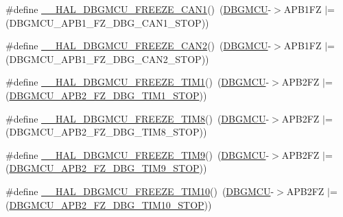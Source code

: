\begin{DoxyCompactItemize}
\item 
\#define \hyperlink{group___h_a_l___exported___macros_ga1d225003f36f6a22ffea1a41a4a78cec}{\+\_\+\+\_\+\+H\+A\+L\+\_\+\+D\+B\+G\+M\+C\+U\+\_\+\+F\+R\+E\+E\+Z\+E\+\_\+\+C\+A\+N1}()~(\hyperlink{group___peripheral__declaration_ga92ec6d9ec2251fda7d4ce09748cd74b4}{D\+B\+G\+M\+CU}-\/$>$A\+P\+B1\+FZ $\vert$= (D\+B\+G\+M\+C\+U\+\_\+\+A\+P\+B1\+\_\+\+F\+Z\+\_\+\+D\+B\+G\+\_\+\+C\+A\+N1\+\_\+\+S\+T\+OP))
\item 
\#define \hyperlink{group___h_a_l___exported___macros_gadb4f2b03a03936de95c1a9f939d452c0}{\+\_\+\+\_\+\+H\+A\+L\+\_\+\+D\+B\+G\+M\+C\+U\+\_\+\+F\+R\+E\+E\+Z\+E\+\_\+\+C\+A\+N2}()~(\hyperlink{group___peripheral__declaration_ga92ec6d9ec2251fda7d4ce09748cd74b4}{D\+B\+G\+M\+CU}-\/$>$A\+P\+B1\+FZ $\vert$= (D\+B\+G\+M\+C\+U\+\_\+\+A\+P\+B1\+\_\+\+F\+Z\+\_\+\+D\+B\+G\+\_\+\+C\+A\+N2\+\_\+\+S\+T\+OP))
\item 
\#define \hyperlink{group___h_a_l___exported___macros_ga93d7e54d78e5dea068f5f6a94d5f94c7}{\+\_\+\+\_\+\+H\+A\+L\+\_\+\+D\+B\+G\+M\+C\+U\+\_\+\+F\+R\+E\+E\+Z\+E\+\_\+\+T\+I\+M1}()~(\hyperlink{group___peripheral__declaration_ga92ec6d9ec2251fda7d4ce09748cd74b4}{D\+B\+G\+M\+CU}-\/$>$A\+P\+B2\+FZ $\vert$= (\hyperlink{group___peripheral___registers___bits___definition_ga3eb7be194b6ffb258b9e9f5ed08a931e}{D\+B\+G\+M\+C\+U\+\_\+\+A\+P\+B2\+\_\+\+F\+Z\+\_\+\+D\+B\+G\+\_\+\+T\+I\+M1\+\_\+\+S\+T\+OP}))
\item 
\#define \hyperlink{group___h_a_l___exported___macros_gaeee90b698bfc2421155265b4c5b43f09}{\+\_\+\+\_\+\+H\+A\+L\+\_\+\+D\+B\+G\+M\+C\+U\+\_\+\+F\+R\+E\+E\+Z\+E\+\_\+\+T\+I\+M8}()~(\hyperlink{group___peripheral__declaration_ga92ec6d9ec2251fda7d4ce09748cd74b4}{D\+B\+G\+M\+CU}-\/$>$A\+P\+B2\+FZ $\vert$= (D\+B\+G\+M\+C\+U\+\_\+\+A\+P\+B2\+\_\+\+F\+Z\+\_\+\+D\+B\+G\+\_\+\+T\+I\+M8\+\_\+\+S\+T\+OP))
\item 
\#define \hyperlink{group___h_a_l___exported___macros_ga391a0780e10993d06c519addf582a438}{\+\_\+\+\_\+\+H\+A\+L\+\_\+\+D\+B\+G\+M\+C\+U\+\_\+\+F\+R\+E\+E\+Z\+E\+\_\+\+T\+I\+M9}()~(\hyperlink{group___peripheral__declaration_ga92ec6d9ec2251fda7d4ce09748cd74b4}{D\+B\+G\+M\+CU}-\/$>$A\+P\+B2\+FZ $\vert$= (\hyperlink{group___peripheral___registers___bits___definition_gaf12c17533a1e3262ee11f760e44f5127}{D\+B\+G\+M\+C\+U\+\_\+\+A\+P\+B2\+\_\+\+F\+Z\+\_\+\+D\+B\+G\+\_\+\+T\+I\+M9\+\_\+\+S\+T\+OP}))
\item 
\#define \hyperlink{group___h_a_l___exported___macros_gaee80dea9c85b61d2fb2499cbd97d8478}{\+\_\+\+\_\+\+H\+A\+L\+\_\+\+D\+B\+G\+M\+C\+U\+\_\+\+F\+R\+E\+E\+Z\+E\+\_\+\+T\+I\+M10}()~(\hyperlink{group___peripheral__declaration_ga92ec6d9ec2251fda7d4ce09748cd74b4}{D\+B\+G\+M\+CU}-\/$>$A\+P\+B2\+FZ $\vert$= (\hyperlink{group___peripheral___registers___bits___definition_ga24d4bbf803a65e8202b0019ed0ce0ebb}{D\+B\+G\+M\+C\+U\+\_\+\+A\+P\+B2\+\_\+\+F\+Z\+\_\+\+D\+B\+G\+\_\+\+T\+I\+M10\+\_\+\+S\+T\+OP}))

\end{DoxyCompactItemize}
